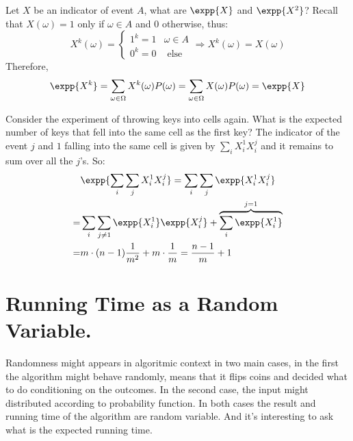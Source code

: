 \begin{example} Let $X$ be an indicator of event $A$, what are $\expp{X}$ and $\expp{X^{2}}$? Recall that $X(\omega) = 1$ only if $\omega \in A$ and $0$ otherwise, thus: 
  \begin{equation*}
    X^{k}(\omega) = \begin{cases}
      1^{k} = 1 & \omega \in A \\
      0^{k} = 0 & \text{ else }
    \end{cases} \Rightarrow X^{k}(\omega) = X(\omega)
  \end{equation*}
  Therefore, 
  \begin{equation*}
    \begin{split}
      \expp{X^{k}} = \sum_{\omega \in \Omega}{ X^{k}(\omega)  P(\omega)  } = \sum_{\omega \in \Omega}{ X(\omega)  P(\omega)  }=\expp{X} 
    \end{split}
  \end{equation*}
\end{example}
\begin{example}
  
Consider the experiment of throwing keys into cells again. What is the expected number of keys that fell into the same cell as the first key?  The indicator of the event $j$ and $1$ falling into the same cell is given by $\sum_{i}X_{i}^{1}X_{i}^{j}$ and it remains to sum over all the $j$'s. So:
  \begin{equation*}
    \begin{split}
      & \expp{ \sum_{i}\sum_{j}X_{i}^{1}X_{i}^{j}} = \sum_{i}\sum_{j}\expp{X_{i}^{1}X_{i}^{j}} \\  
      = &   \sum_{i}\sum_{j\neq 1}\expp{X_{i}^{1}}\expp{X_{i}^{j}} +  \overbrace{\sum_{i}\expp{X_{i}^{1}}}^{ j = 1} \\ 
      = & m \cdot (n-1) \frac{1}{m^{2}} + m\cdot \frac{1}{m} = \frac{n-1}{m} + 1 
    \end{split}
  \end{equation*}
\end{example}
\section{Running Time as a Random Variable.}
Randomness might appears in algoritmic context in two main cases, in the first the algorithm might behave randomly, means that it flips coins and decided what to do conditioning on the outcomes. In the second case, the input might distributed according to probability function. In both cases the result and running time of the algorithm are random variable. And it's interesting to ask what is the expected running time.

